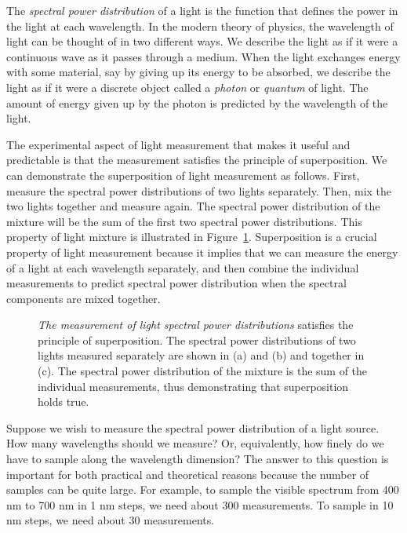 The {\em spectral power distribution} of a light
is the function that defines the power
in the light at each wavelength.
In the modern theory of physics, the wavelength of light
can be thought of in two different ways.
We describe the light as if it were
a continuous wave as it passes through a medium.
When the light exchanges energy with some material,
say by giving up its energy to be absorbed,
we describe the light as if it were a discrete object
called a {\em photon} or {\em quantum} of light.
The amount of energy given up by the photon is predicted
by the wavelength of the light.

The experimental aspect of light measurement
that makes it useful and predictable
is that the measurement
satisfies the principle of superposition.
We can demonstrate the superposition of light
measurement as follows.
First, measure the spectral power distributions
of two lights separately.
Then, mix the two lights together and measure again.
The spectral power distribution of the mixture
will be the sum of the first two spectral power distributions.
This property of light mixture
is illustrated in Figure~\ref{f3:ill.superposition}.
Superposition is a crucial property of light measurement
because it implies that we can
measure the energy of a light at each wavelength separately,
and then combine the individual measurements
to predict spectral power distribution
when the spectral components are mixed together.
\begin{figure}
\centerline {
}
\caption[Light Superposition]{
{\em The measurement of light spectral power
distributions} satisfies the principle of superposition.
The spectral power distributions of two lights measured
separately are shown in (a) and (b) and together in (c).
The spectral power distribution of the mixture is the
sum of the individual measurements, thus demonstrating that
superposition holds true.
}
\label{f3:ill.superposition}
\end{figure}

Suppose we wish to measure the spectral power
distribution of a light source.
How many wavelengths should we measure?  Or, equivalently,
how finely do we have to sample
along the wavelength dimension?
The answer to this question is important for both practical
and theoretical reasons because the number
of samples can be quite large.
For example, to sample the visible spectrum
from 400 nm to 700 nm in 1 nm steps,
we need about 300 measurements.
To sample in 10 nm steps,
we need about 30 measurements.

